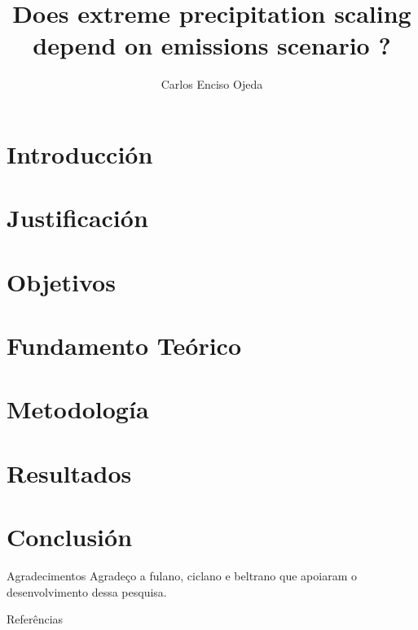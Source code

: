 \documentclass[11pt]{beamer}
\title[IVRRHH Exposición]{Does extreme precipitation scaling depend on emissions scenario ?}
\author[Carlos, E. O.]{
Carlos Enciso Ojeda}
\begin{document}


\section{Introducción} 


\section{Justificación}


\section{Objetivos}


\section{Fundamento Teórico}


\section{Metodología}


\section{Resultados}


\section{Conclusión}


\begin{frame}{Agradecimentos}
    \large{Agradeço a fulano, ciclano e beltrano que apoiaram o desenvolvimento dessa pesquisa.}
\end{frame}


\nocite{*}
\begin{frame}[allowframebreaks]{Referências}


\end{frame}


\begin{frame}
\titlepage 
\end{frame}
\end{document}
